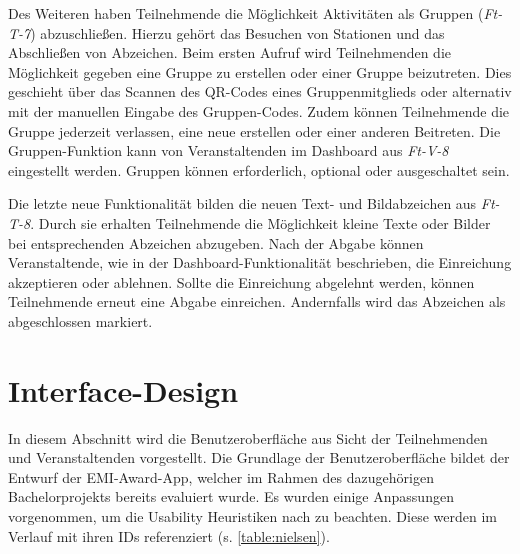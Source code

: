 Des Weiteren haben Teilnehmende die Möglichkeit Aktivitäten als Gruppen
(\textit{Ft-T-7}) abzuschließen. Hierzu gehört das Besuchen von Stationen und
das Abschließen von Abzeichen. Beim ersten Aufruf wird Teilnehmenden die
Möglichkeit gegeben eine Gruppe zu erstellen oder einer Gruppe beizutreten. Dies
geschieht über das Scannen des QR-Codes eines Gruppenmitglieds oder alternativ
mit der manuellen Eingabe des Gruppen-Codes. Zudem können Teilnehmende die
Gruppe jederzeit verlassen, eine neue erstellen oder einer anderen Beitreten.
Die Gruppen-Funktion kann von Veranstaltenden im Dashboard aus \textit{Ft-V-8}
eingestellt werden. Gruppen können erforderlich, optional oder ausgeschaltet
sein.

Die letzte neue Funktionalität bilden die neuen Text- und Bildabzeichen aus
\textit{Ft-T-8}. Durch sie erhalten Teilnehmende die Möglichkeit kleine Texte
oder Bilder bei entsprechenden Abzeichen abzugeben. Nach der Abgabe können
Veranstaltende, wie in der Dashboard-Funktionalität beschrieben, die Einreichung
akzeptieren oder ablehnen. Sollte die Einreichung abgelehnt werden, können
Teilnehmende erneut eine Abgabe einreichen. Andernfalls wird das Abzeichen als
abgeschlossen markiert.

\section{Interface-Design}

In diesem Abschnitt wird die Benutzeroberfläche aus Sicht der Teilnehmenden und
Veranstaltenden vorgestellt. Die Grundlage der Benutzeroberfläche bildet der
Entwurf der EMI-Award-App, welcher im Rahmen des dazugehörigen Bachelorprojekts
bereits evaluiert wurde. Es wurden einige Anpassungen vorgenommen, um die
Usability Heuristiken nach \textcite{Nielsen1994} zu beachten. Diese
werden im Verlauf mit ihren IDs referenziert (s. \autoref{table:nielsen}).

